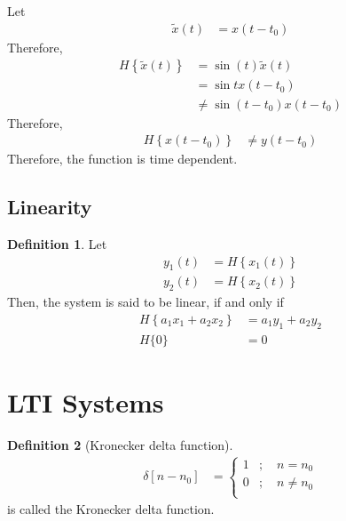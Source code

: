 \documentclass[titlepage, fleqn, a4paper, 12pt, twoside]{article}
\theoremstyle{definition}
\newtheorem{definition}{Definition}
\theoremstyle{theorem}
\renewcommand{\tilde}{\widetilde}
\begin{document}
\begin{solution}
	Let
	\begin{align*}
		\tilde{x}(t) & = x(t - t_0)
	\end{align*}
	Therefore,
	\begin{align*}
		H\left\{ \tilde{x}(t) \right\} & = \sin(t) \tilde{x}(t) \\
                                               & = \sin t x(t - t_0)    \\
                                               & \neq \sin(t - t_0) x(t - t_0)
	\end{align*}
	Therefore,
	\begin{align*}
		H\left\{ x(t - t_0) \right\} & \neq y(t - t_0)
	\end{align*}
	Therefore, the function is time dependent.
\end{solution}

\subsection{Linearity}

\begin{definition}
	Let
	\begin{align*}
		y_1(t) & = H\left\{ x_1(t) \right\} \\
		y_2(t) & = H\left\{ x_2(t) \right\}
	\end{align*}
	Then, the system is said to be linear, if and only if
	\begin{align*}
		H\left\{ a_1 x_1 + a_2 x_2 \right\} & = a_1 y_1 + a_2 y_2 \\
		H\{0\}                              & = 0
	\end{align*}
\end{definition}

\section{LTI Systems}

\begin{definition}[Kronecker delta function]
	\begin{align*}
		\delta[n - n_0] &=
			\begin{cases}
				1 & ;\quad n = n_0    \\
				0 & ;\quad n \neq n_0 \\
			\end{cases}
	\end{align*}
	is called the Kronecker delta function.
\end{definition}
\end{document}
